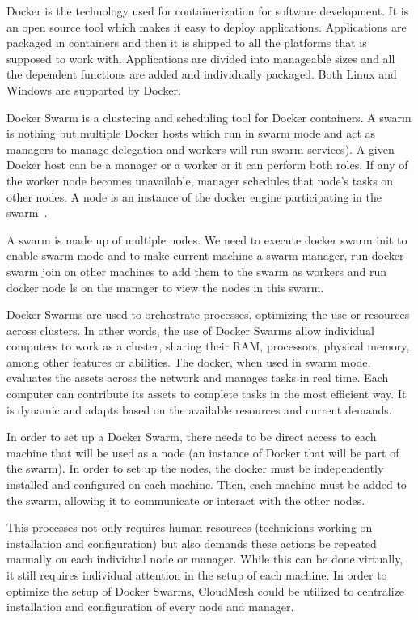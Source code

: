 Docker is the technology used for containerization for software
development. It is an open source tool which makes it easy to deploy
applications. Applications are packaged in containers and then it is
shipped to all the platforms that is supposed to work
with. Applications are divided into manageable sizes and all the
dependent functions are added and individually packaged. Both Linux
and Windows are supported by Docker.
	
Docker Swarm is a clustering and scheduling tool for Docker
containers. A swarm is nothing but multiple Docker hosts which run in
swarm mode and act as managers to manage delegation and workers will
run swarm services). A given Docker host can be a manager or a worker
or it can perform both roles. If any of the worker node becomes
unavailable, manager schedules that node's tasks on other nodes.  A
node is an instance of the docker engine participating in the
swarm~\cite{dockerdoc2017}.
	
A swarm is made up of multiple nodes. We need to execute docker swarm
init to enable swarm mode and to make current machine a swarm manager,
run docker swarm join on other machines to add them to the swarm as
workers and run docker node ls on the manager to view the nodes in
this swarm.
	
Docker Swarms are used to orchestrate processes, optimizing the use or
resources across clusters.  In other words, the use of Docker Swarms
allow individual computers to work as a cluster, sharing their RAM,
processors, physical memory, among other features or abilities.  The
docker, when used in swarm mode, evaluates the assets across the
network and manages tasks in real time. Each computer can contribute
its assets to complete tasks in the most efficient way. It is dynamic
and adapts based on the available resources and current demands.
	
In order to set up a Docker Swarm, there needs to be direct access to
each machine that will be used as a node (an instance of Docker that
will be part of the swarm).  In order to set up the nodes, the docker
must be independently installed and configured on each machine.  Then,
each machine must be added to the swarm, allowing it to communicate or
interact with the other nodes.
	
This processes not only requires human resources (technicians working
on installation and configuration) but also demands these actions be
repeated manually on each individual node or manager. While this can
be done virtually, it still requires individual attention in the setup
of each machine.  In order to optimize the setup of Docker Swarms,
CloudMesh could be utilized to centralize installation and
configuration of every node and manager.
	
